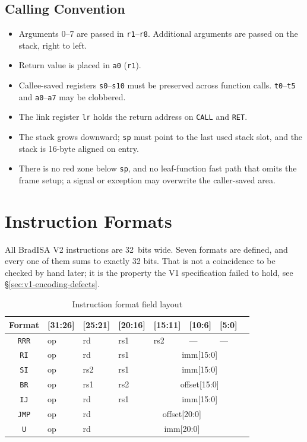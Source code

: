 \documentclass[11pt,a4paper]{article}
\begin{document}
\subsection{Calling Convention}
\begin{itemize}[nosep]
  \item Arguments 0--7 are passed in {\tt r1}--{\tt r8}. Additional arguments are
        passed on the stack, right to left.
  \item Return value is placed in {\tt a0} ({\tt r1}).
  \item Callee-saved registers {\tt s0}--{\tt s10} must be preserved across
        function calls. {\tt t0}--{\tt t5} and {\tt a0}--{\tt a7} may be
        clobbered.
  \item The link register {\tt lr} holds the return address on {\tt CALL} and
        {\tt RET}.
  \item The stack grows downward; {\tt sp} must point to the last used stack
        slot, and the stack is 16-byte aligned on entry.
  \item There is no red zone below {\tt sp}, and no leaf-function fast path that
        omits the frame setup; a signal or exception may overwrite the
        caller-saved area.
\end{itemize}

\newpage

\section{Instruction Formats}

All BradISA V2 instructions are 32~bits wide. Seven formats are defined, and
every one of them sums to exactly 32 bits. That is not a coincidence to be
checked by hand later; it is the property the V1 specification failed to hold,
see \S\ref{sec:v1-encoding-defects}.

\begin{table}[htbp]
\centering
\caption{Instruction format field layout}
\begin{tabular}{clllllll}
\toprule
Format  & [31:26] & [25:21] & [20:16] & [15:11] & [10:6] & [5:0] \\
\midrule
{\tt RRR} & op & rd & rs1 & rs2 & --- & --- \\
{\tt RI}  & op & rd & rs1 & \multicolumn{4}{c}{imm[15:0]} \\
{\tt SI}  & op & rs2 & rs1 & \multicolumn{4}{c}{imm[15:0]} \\
{\tt BR}  & op & rs1 & rs2 & \multicolumn{4}{c}{offset[15:0]} \\
{\tt IJ}  & op & rd & rs1 & \multicolumn{4}{c}{imm[15:0]} \\
{\tt JMP} & op & rd & \multicolumn{5}{c}{offset[20:0]} \\
{\tt U}   & op & rd & \multicolumn{5}{c}{imm[20:0]} \\
\bottomrule
\end{tabular}
\end{table}
\end{document}
